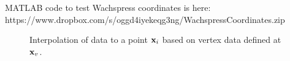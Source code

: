 \documentclass[11pt]{report}
\begin{document}
MATLAB code to test Wachspress coordinates is here: \\ https://www.dropbox.com/s/oggd4iyekeqg3ng/WachspressCoordinates.zip

\begin{figure}
  \caption{Interpolation of data to a point ${\bf x}_i$ based on vertex data defined at ${\bf x}_{v}$.}
  \label{fig:vector_interpolation}
\end{figure} 
\end{document}

